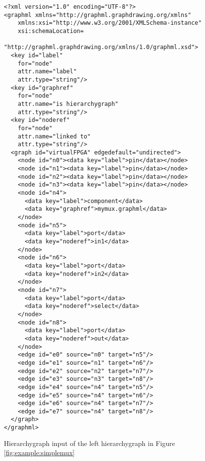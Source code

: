 \begin{figure}[h]
\centering
\begin{lstlisting}[frame=single,  basicstyle=\scriptsize]
<?xml version="1.0" encoding="UTF-8"?>
<graphml xmlns="http://graphml.graphdrawing.org/xmlns"  
    xmlns:xsi="http://www.w3.org/2001/XMLSchema-instance"
    xsi:schemaLocation=
    "http://graphml.graphdrawing.org/xmlns/1.0/graphml.xsd">
  <key id="label"
    for="node"
    attr.name="label"
    attr.type="string"/>
  <key id="graphref"
    for="node"
    attr.name="is hierarchygraph"
    attr.type="string"/>
  <key id="noderef"
    for="node"
    attr.name="linked to"
    attr.type="string"/>
  <graph id="virtualFPGA" edgedefault="undirected">
    <node id="n0"><data key="label">pin</data></node>
    <node id="n1"><data key="label">pin</data></node>
    <node id="n2"><data key="label">pin</data></node>
    <node id="n3"><data key="label">pin</data></node>
    <node id="n4">
      <data key="label">component</data>
      <data key="graphref">mymux.graphml</data>
    </node>
    <node id="n5">
      <data key="label">port</data>
      <data key="noderef">in1</data>
    </node>
    <node id="n6">
      <data key="label">port</data>
      <data key="noderef">in2</data>
    </node>
    <node id="n7">
      <data key="label">port</data>
      <data key="noderef">select</data>
    </node>
    <node id="n8">
      <data key="label">port</data>
      <data key="noderef">out</data>
    </node>
    <edge id="e0" source="n0" target="n5"/>
    <edge id="e1" source="n1" target="n6"/>
    <edge id="e2" source="n2" target="n7"/>
    <edge id="e3" source="n3" target="n8"/>
    <edge id="e4" source="n4" target="n5"/>
    <edge id="e5" source="n4" target="n6"/>
    <edge id="e6" source="n4" target="n7"/>
    <edge id="e7" source="n4" target="n8"/>
  </graph>
</graphml>
\end{lstlisting}
\caption{Hierarchygraph input of the left hierarchygraph in Figure \ref{fig:example:simplemux}}
\label{fig:example:simplemuxListing1}
\end{figure}

